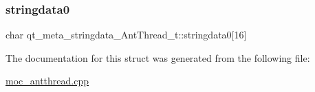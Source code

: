 \subsubsection{\texorpdfstring{stringdata0}{stringdata0}}
{\footnotesize\ttfamily char qt\+\_\+meta\+\_\+stringdata\+\_\+\+Ant\+Thread\+\_\+t\+::stringdata0\mbox{[}16\mbox{]}}



The documentation for this struct was generated from the following file\+:\begin{DoxyCompactItemize}
\item 
\hyperlink{moc__antthread_8cpp}{moc\+\_\+antthread.\+cpp}\end{DoxyCompactItemize}
